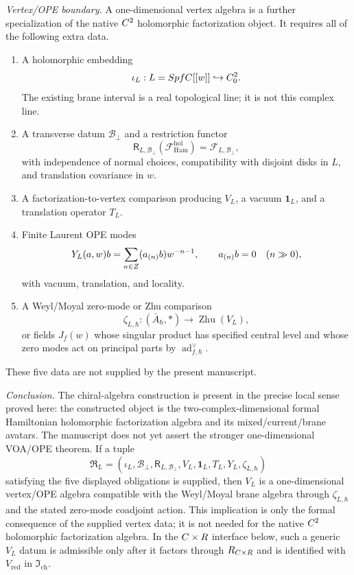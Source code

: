 \begin{stmt}
  \emph{Vertex/OPE boundary.} A one-dimensional vertex algebra is a
  further specialization of the native \(C^2\) holomorphic factorization
  object.  It requires all of the following extra data.
  \begin{enumerate}[label=(\arabic*)]
    \item A holomorphic embedding
      \[
        \iota_L: L=SpfC[[w]]
        \hookrightarrow C^2_0 .
      \]
      The existing brane interval is a real topological line; it is not
      this complex line.
    \item A transverse datum \(\mathcal B_\perp\) and a restriction
      functor
      \[
        \mathsf R_{L,\mathcal B_\perp}(\mathcal F_{\mathrm{Ham}}^{\mathrm{hol}})
        =
        \mathcal F_{L,\mathcal B_\perp},
      \]
      with independence of normal choices, compatibility with disjoint
      disks in \(L\), and translation covariance in \(w\).
    \item A factorization-to-vertex comparison producing
      \(V_L\), a vacuum \(\mathbf 1_L\), and a translation operator
      \(T_L\).
    \item Finite Laurent OPE modes
      \[
        Y_L(a,w)b=\sum_{n\in Z}(a_{(n)}b)w^{-n-1},\qquad
        a_{(n)}b=0\quad(n\gg0),
      \]
      with vacuum, translation, and locality.
    \item A Weyl/Moyal zero-mode or Zhu comparison
      \[
        \zeta_{L,\hbar}\colon
        (\bar A_\hbar,*)\longrightarrow \operatorname{Zhu}(V_L),
      \]
      or fields \(J_f(w)\) whose singular product has specified central
      level and whose zero modes act on principal parts by
      \(\operatorname{ad}^{\vee}_{f,\hbar}\).
  \end{enumerate}
  These five data are not supplied by the present manuscript.

  \emph{Conclusion.} The chiral-algebra construction is present in the
  precise local sense proved here: the constructed object is the
  two-complex-dimensional formal Hamiltonian holomorphic
  factorization algebra and its mixed/current/brane avatars.  The
  manuscript does not yet assert the stronger one-dimensional VOA/OPE
  theorem.  If a tuple
  \[
    \mathfrak R_L
    =
    (\iota_L,\mathcal B_\perp,\mathsf R_{L,\mathcal B_\perp},
    V_L,\mathbf 1_L,T_L,Y_L,\zeta_{L,\hbar})
  \]
  satisfying the five displayed obligations is supplied, then \(V_L\)
  is a one-dimensional vertex/OPE algebra compatible with the Weyl/Moyal
  brane algebra through \(\zeta_{L,\hbar}\) and the stated zero-mode
  coadjoint action.  This implication is only the formal consequence of
  the supplied vertex data; it is not needed for the native \(C^2\)
  holomorphic factorization algebra.  In the \(C\times R\) interface below,
  such a generic \(V_L\) datum is admissible only after it factors through
  \(R_{C\times R}\) and is identified with
  \(V_{\mathrm{red}}\) in \(\mathfrak I_{\mathrm{ch}}\).
\end{stmt}

